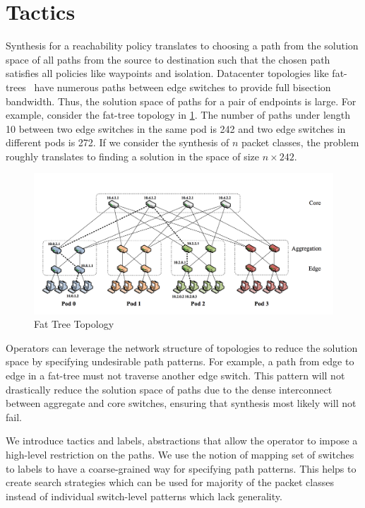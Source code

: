 \section{Tactics} \label{sec:tactic}
Synthesis for a reachability policy translates to choosing a path from the 
solution space of all paths from the source to destination such that the 
chosen path satisfies all policies like waypoints and isolation. Datacenter 
topologies like fat-trees~\cite{fattree} have numerous paths between 
edge switches to provide full bisection bandwidth. 
Thus, the solution space of paths for a pair of endpoints is large. 
For example, consider the fat-tree topology in \cref{fig:fattree}. 
The number of paths under length 10 between two edge  switches 
in the same pod is 242 and two edge switches in different pods is 272. 
If we consider the synthesis of $n$ packet classes, the problem 
roughly translates to finding a solution in the space of size $n \times 242$.
\begin{figure}[H]
	\includegraphics[width=\columnwidth]{fattree.png}
	\caption{Fat Tree Topology}
	\label{fig:fattree}
\end{figure}
Operators can leverage the network structure of topologies
 to reduce the solution space by specifying undesirable path patterns. 
 For example, a path from edge to edge in a fat-tree must not traverse another edge switch.
 This pattern will not drastically reduce the solution space of paths 
 due to the dense interconnect between aggregate and core switches,
 ensuring that synthesis most likely will not fail. 

We introduce tactics and labels, abstractions that allow the 
operator to impose a high-level restriction on the paths. 
We use the notion of mapping set of switches to labels to 
have a coarse-grained way for specifying path patterns. This helps
to create search strategies which can be used for majority 
of the packet classes instead of individual switch-level patterns which
lack generality.

